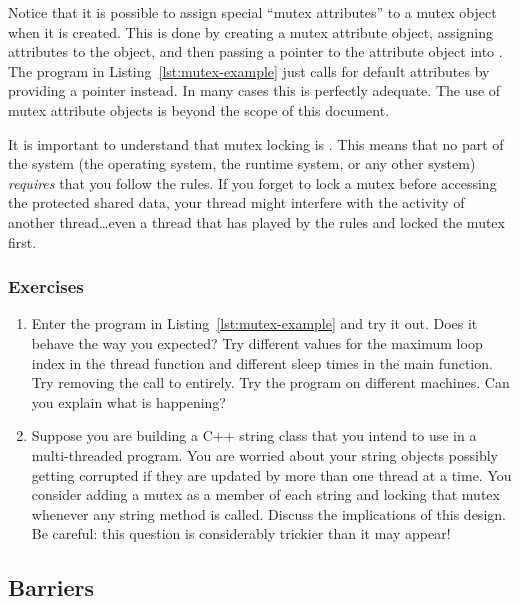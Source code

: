 Notice that it is possible to assign special ``mutex attributes'' to a mutex object when it is
created. This is done by creating a mutex attribute object, assigning attributes to the object,
and then passing a pointer to the attribute object into . The
program in Listing~\ref{lst:mutex-example} just calls for default attributes by providing a
 pointer instead. In many cases this is perfectly adequate. The use of mutex
attribute objects is beyond the scope of this document.

It is important to understand that mutex locking is . This means that no part
of the system (the operating system, the runtime system, or any other system) \emph{requires}
that you follow the rules. If you forget to lock a mutex before accessing the protected shared
data, your thread might interfere with the activity of another thread\ldots even a thread that
has played by the rules and locked the mutex first.

\subsubsection*{Exercises}

\begin{enumerate}
  
\item Enter the program in Listing~\ref{lst:mutex-example} and try it out. Does it behave the
  way you expected? Try different values for the maximum loop index in the thread function and
  different sleep times in the main function. Try removing the call to 
  entirely. Try the program on different machines. Can you explain what is happening?

\item Suppose you are building a C++ string class that you intend to use in a multi-threaded
  program. You are worried about your string objects possibly getting corrupted if they are
  updated by more than one thread at a time. You consider adding a mutex as a member of each
  string and locking that mutex whenever any string method is called. Discuss the implications
  of this design. Be careful: this question is considerably trickier than it may appear!

\end{enumerate}

\subsection{Barriers}
\label{subsec:barriers}

